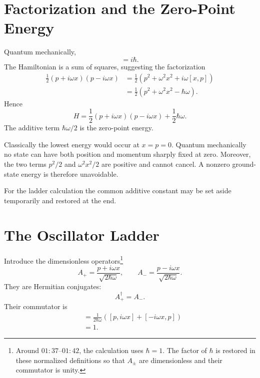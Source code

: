 \section{Factorization and the Zero-Point Energy}

Quantum mechanically,
\begin{equation}
[x,p]=i\hbar.
\end{equation}
The Hamiltonian is a sum of squares, suggesting the factorization
\begin{align}
\frac{1}{2}(p+i\omega x)(p-i\omega x)
&=\frac{1}{2}\left(p^2+\omega^2x^2+i\omega[x,p]\right) \\
&=\frac{1}{2}\left(p^2+\omega^2x^2-\hbar\omega\right).
\end{align}
Hence
\begin{equation}
H=\frac{1}{2}(p+i\omega x)(p-i\omega x)
+\frac{1}{2}\hbar\omega.
\end{equation}
The additive term \(\hbar\omega/2\) is the zero-point energy.

Classically the lowest energy would occur at \(x=p=0\). Quantum mechanically no state can have both position and momentum sharply fixed at zero. Moreover, the two terms \(p^2/2\) and \(\omega^2x^2/2\) are positive and cannot cancel. A nonzero ground-state energy is therefore unavoidable.

For the ladder calculation the common additive constant may be set aside temporarily and restored at the end.

\begin{classroomqa}
\end{classroomqa}

\section{The Oscillator Ladder}

Introduce the dimensionless operators\footnote{Around \(01{:}37\)--\(01{:}42\), the calculation uses \(\hbar=1\). The factor of \(\hbar\) is restored in these normalized definitions so that \(A_\pm\) are dimensionless and their commutator is unity.}
\begin{equation}
A_+=\frac{p+i\omega x}{\sqrt{2\hbar\omega}},
\qquad
A_-=\frac{p-i\omega x}{\sqrt{2\hbar\omega}}.
\end{equation}
They are Hermitian conjugates:
\begin{equation}
A_+^\dagger=A_-.
\end{equation}
Their commutator is
\begin{align}
[A_-,A_+]
&=\frac{1}{2\hbar\omega}
\left([p,i\omega x]+[-i\omega x,p]\right) \\
&=1.
\end{align}

